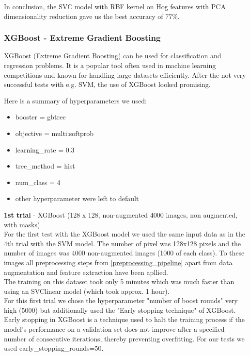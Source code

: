 \documentclass{article}
\begin{document}
In conclusion, the SVC model with RBF kernel on Hog features with PCA dimensionality reduction gave us the best accuracy of 77\%.

\subsubsection{XGBoost - Extreme Gradient Boosting}
XGBoost (Extreme Gradient Boosting) can be used for classification and regression problems. It is a popular tool often used in machine learning 
competitions and  known  for handling large datasets efficiently. After the not very successful tests with e.g. SVM, the use of XGBoost looked promising.

Here is a summary of hyperparameters we used: 

\begin{itemize}
    \item booster = gbtree
    \item  objective = multi:softprob
    \item learning\_rate = 0.3
    \item tree\_method = hist
    \item num\_class = 4
    \item other hyperparameter were left to default
\end{itemize}

\textbf{1st trial} - XGBoost (128 x 128, non-augmented 4000 images, non augmented, with masks) \\
For the first test with the XGBoost model we used the same input data as in the 4th trial with the SVM model. The number of pixel was 128x128 pixels and the number 
of images was 4000 non-augmented images (1000 of each class). To these images all preprocessing steps from \ref{preprocessing_pipeline} apart from data 
augmentation and feature extraction have been apllied.\\
The training on this dataset took only 5 minutes which was much faster than using an SVClinear model (which took approx. 1 hour).\\

For this first trial we chose the hyperparameter "number of boost rounds" very high (5000) but additionally used the "Early stopping technique" of XGBoost. Early stopping in XGBoost
is a technique used to halt the training process if the model's performance on a validation set does not improve after a specified number of consecutive iterations, 
thereby preventing overfitting. For our tests we used early\_stopping\_rounds=50.
\end{document}

